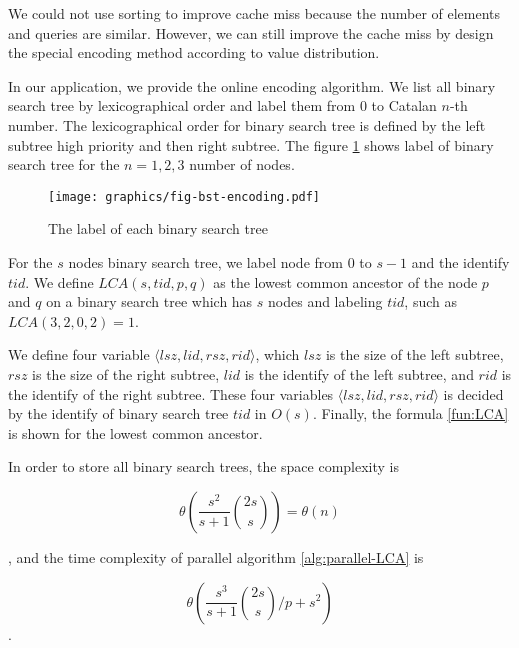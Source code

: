 We could not use sorting to improve cache miss because the number of
elements and queries are similar.  However, we can still improve the
cache miss by design the special encoding method according to value
distribution.

In our application, we provide the online encoding algorithm.  We list
all binary search tree by lexicographical order and label them from
$0$ to Catalan $n$-th number.  The lexicographical order for binary
search tree is defined by the left subtree high priority and then
right subtree.  The figure \ref{fig:labelingBST} shows label of binary
search tree for the $n=1,2,3$ number of nodes.

\begin{figure}[!thb]
  \centering
  \texttt{[image: graphics/fig-bst-encoding.pdf]}
  \caption{The label of each binary search tree}
  \label{fig:labelingBST}
\end{figure}

For the $s$ nodes binary search tree, we label node from $0$ to $s-1$
and the identify $\mathit{tid}$.  We define $\mathit{LCA}(s,
\mathit{tid}, p, q)$ as the lowest common ancestor of the node $p$ and
$q$ on a binary search tree which has $s$ nodes and labeling
$\mathit{tid}$, such as $\mathit{LCA}(3, 2, 0, 2) = 1$.

We define four variable
$\langle\mathit{lsz},\mathit{lid},\mathit{rsz},\mathit{rid}\rangle$,
which $\mathit{lsz}$ is the size of the left subtree, $\mathit{rsz}$
is the size of the right subtree, $\mathit{lid}$ is the identify of
the left subtree, and $\mathit{rid}$ is the identify of the right
subtree.  These four variables
$\langle\mathit{lsz},\mathit{lid},\mathit{rsz},\mathit{rid}\rangle$ is
decided by the identify of binary search tree $\mathit{tid}$ in
$O(s)$.  Finally, the formula \ref{fun:LCA} is shown for the lowest
common ancestor.



In order to store all binary search trees, the space complexity is 

\begin{equation}
\theta\left(\frac{s^2}{s+1} \binom{2s}{s}\right) = \theta\left(n\right)
\end{equation}

, and the time complexity of parallel algorithm \ref{alg:parallel-LCA}
is

\begin{equation}
\theta\left(\frac{s^3}{s+1} \binom{2s}{s} \bigg/ p + s^2 \right)
\end{equation}.

